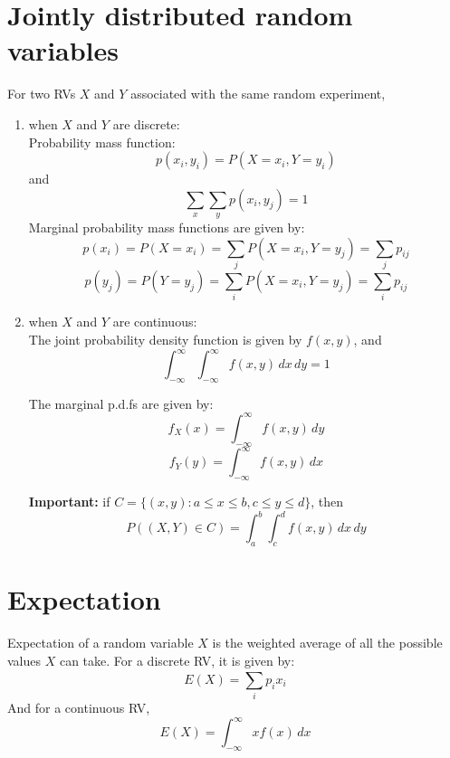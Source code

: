 \documentclass{article}
\begin{document}
\section{Jointly distributed random variables}
For two RVs $ X $ and $ Y $ associated with the same random experiment,
\begin{enumerate}
  \item when $ X $ and $ Y $ are discrete: \\
  Probability mass function:
  \begin{equation*}
    p(x_{i}, y_{i}) = P(X = x_{i}, Y = y_{i})
  \end{equation*} 
  and
  \begin{equation*}
    \sum_{x}^{} \sum_{y}^{} p(x_{i}, y_{j}) = 1 
  \end{equation*}
  Marginal probability mass functions are given by: 
  \begin{equation*}
    p(x_{i}) = P(X = x_{i}) = \sum_{j}^{}P(X = x_{i}, Y = y_{j}) = \sum_{j}^{}p_{ij}
  \end{equation*}
  \begin{equation*}
    p(y_{j}) = P(Y = y_{j}) = \sum_{i}^{}P(X = x_{i}, Y = y_{j}) = \sum_{i}^{}p_{ij}
  \end{equation*}

\item when $ X $ and $ Y $ are continuous: \\
The joint probability density function is given by $ f(x, y) $, and
\begin{equation*}
\int_{-\infty}^{\infty} \int_{-\infty}^{\infty} f(x,y) \,dx  \,dy = 1
\end{equation*}

The marginal p.d.fs are given by:
\begin{equation*}
f_{X}(x) = \int_{-\infty}^{\infty} f(x, y) \,dy
\end{equation*}
\begin{equation*}
    f_{Y}(y) = \int_{-\infty}^{\infty} f(x, y) \,dx
\end{equation*}

\textbf{Important:} if $ C = \{(x,y): a \leq x \leq b, c \leq y \leq d\} $, then
\begin{equation*}
P((X,Y) \in C) = \int_{a}^{b} \int_{c}^{d} f(x,y) \,dx  \,dy
\end{equation*}
\end{enumerate}
\section{Expectation}
\begin{definition}[Expectation]
    Expectation of a random variable $ X $ is the weighted average of all the possible values $ X $
    can take. For a discrete RV, it is given by:
    \begin{equation*}
    E(X) = \sum_{i}^{}p_{i}x_{i}
    \end{equation*}
    And for a continuous RV, 
    \begin{equation*}
    E(X) = \int_{-\infty}^{\infty}xf(x)  \,dx 
    \end{equation*}
\end{definition}
\end{document}
